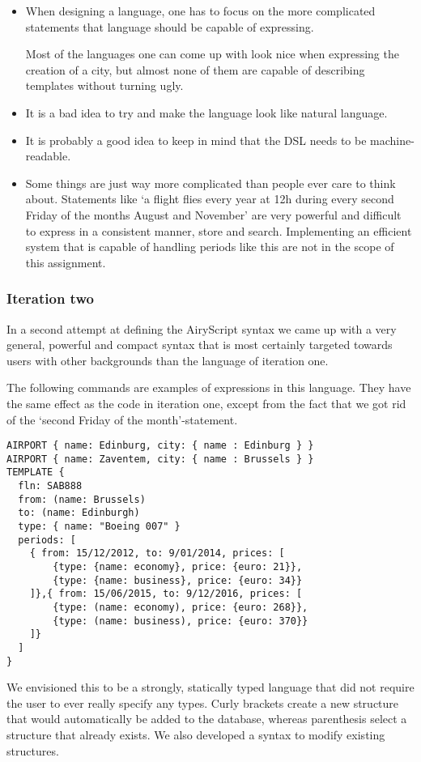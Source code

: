 \begin{itemize}
  \item When designing a language, one has to focus on the more complicated
    statements that language should be capable of expressing.

    Most of the languages one can come up with look nice when expressing the
    creation of a city, but almost none of them are capable of describing
    templates without turning ugly.
  \item It is a bad idea to
  try and make the language look like natural language.
  \item It is probably a good idea to keep in mind that the DSL needs to be
    machine-readable.
  \item Some things are just way more complicated than people ever care to think
    about. Statements like ‘a flight flies every year at 12h during every second
    Friday of the months August and November’ are very powerful and difficult to
    express in a consistent manner, store and search. Implementing an efficient
    system that is capable of handling periods like this are not in the scope of
    this assignment.
\end{itemize}


\subsubsection{Iteration two}
In a second attempt at defining the AiryScript syntax we came up with a very
general, powerful and compact syntax that is most certainly targeted towards
users with other backgrounds than the language of iteration one.

The following commands are examples of expressions in this language. They have
the same effect as the code in iteration one, except from the fact that we got
rid of the ‘second Friday of the month’-statement.
\begin{lstlisting}[language=empty,frame=single]
AIRPORT { name: Edinburg, city: { name : Edinburg } }
AIRPORT { name: Zaventem, city: { name : Brussels } }
TEMPLATE {
  fln: SAB888
  from: (name: Brussels)
  to: (name: Edinburgh)
  type: { name: "Boeing 007" }
  periods: [
    { from: 15/12/2012, to: 9/01/2014, prices: [
        {type: {name: economy}, price: {euro: 21}},
        {type: {name: business}, price: {euro: 34}}
    ]},{ from: 15/06/2015, to: 9/12/2016, prices: [
        {type: (name: economy), price: {euro: 268}},
        {type: (name: business), price: {euro: 370}}
    ]}
  ]
}
\end{lstlisting}
We envisioned this to be a strongly, statically typed language that did not
require the user to ever really specify any types. Curly brackets create a new
structure that would automatically be added to the database, whereas parenthesis
select a structure that already exists. We also developed a syntax to modify
existing structures.

